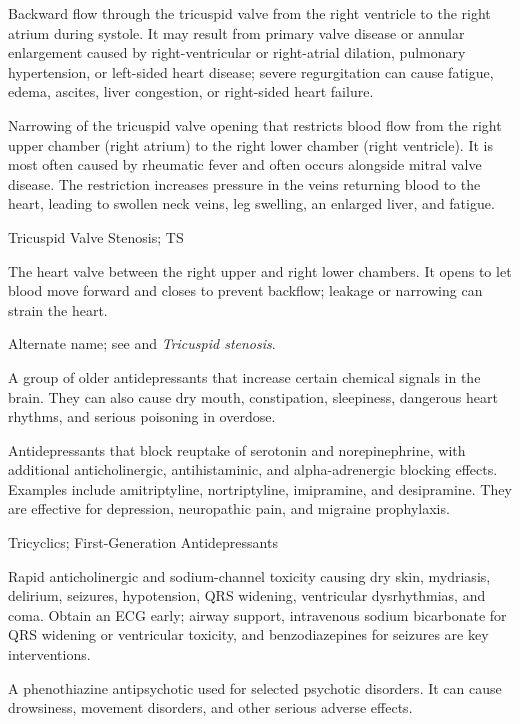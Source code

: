  Backward flow through the tricuspid valve from the right ventricle to the right atrium during systole. It may result from primary valve disease or annular enlargement caused by right-ventricular or right-atrial dilation, pulmonary hypertension, or left-sided heart disease; severe regurgitation can cause fatigue, edema, ascites, liver congestion, or right-sided heart failure.

 Narrowing of the tricuspid valve opening that restricts blood flow from the right upper chamber (right atrium) to the right lower chamber (right ventricle). It is most often caused by rheumatic fever and often occurs alongside mitral valve disease. The restriction increases pressure in the veins returning blood to the heart, leading to swollen neck veins, leg swelling, an enlarged liver, and fatigue.

\synonyms
Tricuspid Valve Stenosis; TS

 The heart valve between the right upper and right lower chambers. It opens to let blood move forward and closes to prevent backflow; leakage or narrowing can strain the heart.

 Alternate name; see  and \textit{Tricuspid stenosis}.

 A group of older antidepressants that increase certain chemical signals in the brain. They can also cause dry mouth, constipation, sleepiness, dangerous heart rhythms, and serious poisoning in overdose.

 Antidepressants that block reuptake of serotonin and norepinephrine, with additional
anticholinergic, antihistaminic, and alpha-adrenergic blocking effects. Examples include
amitriptyline, nortriptyline, imipramine, and desipramine. They are effective for
depression, neuropathic pain, and migraine prophylaxis.

\synonyms
Tricyclics; First-Generation Antidepressants

 Rapid anticholinergic and sodium-channel toxicity causing dry skin, mydriasis, delirium, seizures, hypotension, QRS widening, ventricular dysrhythmias, and coma. Obtain an ECG early; airway support, intravenous sodium bicarbonate for QRS widening or ventricular toxicity, and benzodiazepines for seizures are key interventions.

 A phenothiazine antipsychotic used for selected psychotic disorders. It can cause drowsiness, movement disorders, and other serious adverse effects.


